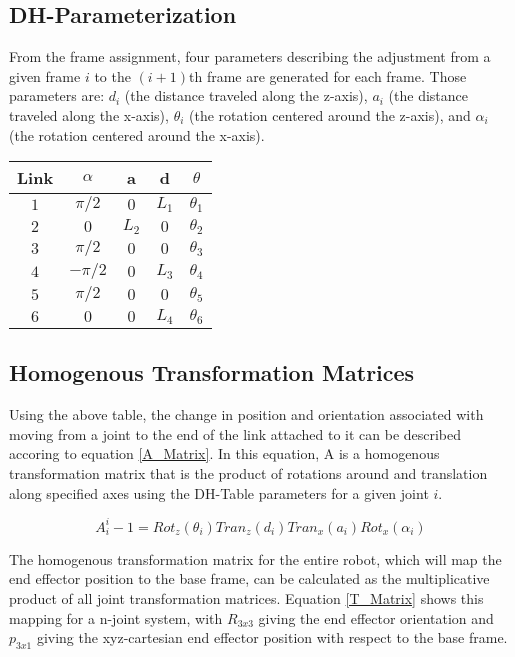 \documentclass[10pt,journal]{IEEEtran}
\begin{document}
\subsection{DH-Parameterization}
From the frame assignment, four parameters describing the adjustment from a given frame $i$ to the $(i+1)$th frame are generated for each frame. Those parameters are: $d_i$ (the distance traveled along the z-axis), $a_i$ (the distance traveled along the x-axis), $\theta_i$ (the rotation centered around the z-axis), and $\alpha_i$ (the rotation centered around the x-axis).
\begin{center}
\begin{tabular}{ | c | c | c | c | c | } 
		\hline
		Link   & $\alpha$ & a     & d     & $\theta$   \\
\hline\hline
		$1$    & $\pi/2$  & $0$   & $L_1$ & $\theta_1$ \\
\hline
		$2$    & $0$      & $L_2$ & $0$   & $\theta_2$ \\
\hline
		$3$    & $\pi/2$  & $0$   & $0$   & $\theta_3$ \\
\hline
		$4$    & $-\pi/2$ & $0$   & $L_3$ & $\theta_4$ \\
\hline
		$5$    & $\pi/2$  & $0$   & $0$   & $\theta_5$ \\
\hline
		$6$    & $0$      & $0$   & $L_4$ & $\theta_6$ \\
		\hline
	\end{tabular}
\end{center}

\subsection{Homogenous Transformation Matrices}
Using the above table, the change in position and orientation
associated with moving from a joint to the end of the link
attached to it can be described accoring to equation \ref{A_Matrix}. In this
equation, A is a homogenous transformation matrix that is
the product of rotations around and translation along specified
axes using the DH-Table parameters for a given joint $i$.

\begin{equation}\label{A_Matrix}
	A_i^i-1=Rot_z(\theta_i)Tran_z(d_i)Tran_x(a_i)Rot_x(\alpha_i)
\end{equation}

The homogenous transformation matrix for the entire robot,
which will map the end effector position to the base frame,
can be calculated as the multiplicative product of all joint
transformation matrices. Equation \ref{T_Matrix} shows this mapping for
a n-joint system, with $R_{3x3}$ giving the end effector orientation and $p_{3x1}$ giving the xyz-cartesian end effector position with respect to the base frame.
\end{document}
